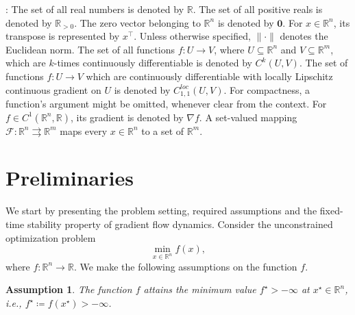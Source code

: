 \documentclass[letterpaper]{article}
\newtheorem{assumption}{Assumption}
\begin{document}

: The set of all real numbers is denoted by $\mathbb{R}$. The set of all positive reals is denoted by $\mathbb{R}_{>0}$. The zero vector belonging to $\mathbb{R}^n$ is denoted by $\bm{0}$. For $x\in \mathbb{R}^n$, its transpose is represented by $x^\intercal$. Unless otherwise specified, $\|\cdot\|$ denotes the Euclidean norm. The set of all functions $f\!:\!U\!\to\!V$, where $U\subseteq \mathbb{R}^n$ and $V\subseteq \mathbb{R}^m$, which are $k$-times continuously differentiable is denoted by $C^k(U,V)$. The set of functions $f\!:\!U\!\rightarrow \!V$ which are continuously differentiable with locally Lipschitz continuous gradient on $U$ is denoted by $C^{loc}_{1,1}(U,V)$. For compactness, a function's argument might be omitted, whenever clear from the context. For $f\in C^1(\mathbb{R}^n, \mathbb{R})$, its gradient is denoted by $\nabla f$. A set-valued mapping $\mathcal{F}:\mathbb{R}^n \rightrightarrows \mathbb{R}^m$ maps every $x\in \mathbb{R}^n$ to a set of $\mathbb{R}^m$.


\section{Preliminaries} \label{sec: prelims}
We start by presenting the problem setting, required assumptions and the fixed-time stability property of gradient flow dynamics. Consider the unconstrained optimization problem 
\begin{equation} \label{opt_prob}
\min_{x\in \mathbb{R}^n} f(x),
\end{equation}
where $f:\mathbb{R}^n \to \mathbb{R}$. We make the following assumptions on the function $f$.

\begin{assumption} \label{basicasmp}
The function $f$ attains the minimum value $f^\star>-\infty$ at $x^\star \in \mathbb{R}^n$, i.e., $f^\star \coloneqq f(x^\star)>-\infty$.
\end{assumption}
\end{document}
